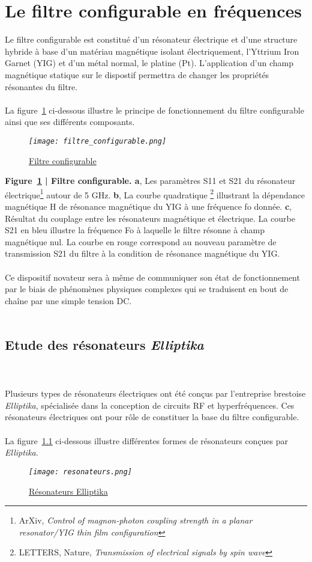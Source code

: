 \documentclass[12pt,fleqn]{book} %
\begin{document}
\part{Le filtre configurable en fréquences}
Le filtre configurable est constitué d’un résonateur électrique et d’une
structure hybride à base d’un matériau magnétique isolant électriquement, l’Yttrium
Iron Garnet (YIG) et d’un métal normal, le platine (Pt). L’application d’un champ
magnétique statique sur le dispostif permettra de changer les propriétés résonantes du
filtre.
~\\\\La figure~\underline{\color{blue}\ref{filtre}} ci-dessous illustre le principe de fonctionnement du filtre configurable ainsi que ses différents composants.
\begin{figure}[H]
	\centering
	\itshape
	\texttt{[image: filtre\_configurable.png]}
	\caption{\label{filtre} \underline{Filtre configurable}}
\end{figure}
\noindent\footnotesize  \textbf{Figure~\underline{\color{blue}\ref{filtre}} | Filtre configurable. a}, Les paramètres S11 et S21 du résonateur électrique\footnote{ArXiv, \emph{Control of magnon-photon coupling strength in a planar resonator\slash YIG thin film configuration}} autour de 5 GHz. \textbf{b}, La courbe quadratique \footnote{LETTERS, Nature, \emph{Transmission of electrical signals by spin wave}} illustrant la dépendance magnétique H de résonance magnétique du YIG à une fréquence fo donnée. \textbf{c}, Résultat du couplage entre les résonateurs magnétique et électrique\footnotemark[2]. La courbe S21 en bleu illustre la fréquence Fo à laquelle le filtre résonne à champ magnétique nul. La courbe en rouge correspond au nouveau paramètre de transmission S21 du filtre à la condition de résonance magnétique du YIG. 
~\\\\
\normalsize Ce dispositif novateur sera à même de communiquer son état de fonctionnement par le
biais de phénomènes physiques complexes qui se traduisent en bout de chaîne par une simple tension
DC.~\\\\

\setcounter{chapter}{0}
\chapter{Etude des résonateurs \emph{Elliptika}} 
~\\\\Plusieurs types de résonateurs électriques ont été conçus par l'entreprise brestoise \emph{Elliptika}, spécialisée dans la conception de circuits RF et hyperfréquences. Ces résonateurs électriques ont pour rôle de constituer la base du filtre configurable.
~\\\\La figure~\underline{\color{blue}\ref{resonateurs}} ci-dessous illustre différentes formes de résonateurs conçues par \emph{Elliptika}.
\begin{figure}[H]
	\centering
	\itshape
	\texttt{[image: resonateurs.png]}
	\caption{\label{resonateurs} \underline{Résonateurs Elliptika}}
\end{figure}
\end{document}
